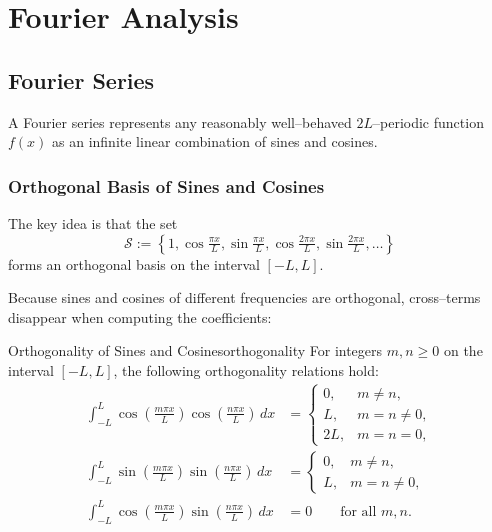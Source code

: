 \chapter{Fourier Analysis}
\label{ch:fourier}

\section{Fourier Series}
\label{sec:fourier-series}

A Fourier series represents any reasonably well--behaved \(2L\)--periodic function \(f(x)\) as an infinite linear combination of sines and cosines.

\subsection{Orthogonal Basis of Sines and Cosines}
The key idea is that the set
\begin{equation}
    \mathcal{S} := \left\{1,\cos\tfrac{\pi x}{L},\sin\tfrac{\pi x}{L},\cos\tfrac{2\pi x}{L},\sin\tfrac{2\pi x}{L},\dots \right\}
\end{equation}
forms an orthogonal basis on the interval \([-L,L]\).

Because sines and cosines of different frequencies are orthogonal, cross--terms disappear when computing the coefficients:

\begin{proposition}{Orthogonality of Sines and Cosines}{orthogonality}
    For integers \( m, n \geq 0 \) on the interval \([-L, L]\), the following orthogonality relations hold:
    \begin{align*}
        \int_{-L}^{L} \cos\left(\tfrac{m\pi x}{L}\right) \cos\left(\tfrac{n\pi x}{L}\right) \, dx
         & =
        \begin{cases}
            0,  & m \neq n,     \\
            L,  & m = n \neq 0, \\
            2L, & m = n = 0,
        \end{cases}                 \\
        \int_{-L}^{L} \sin\left(\tfrac{m\pi x}{L}\right) \sin\left(\tfrac{n\pi x}{L}\right) \, dx
         & =
        \begin{cases}
            0, & m \neq n,     \\
            L, & m = n \neq 0,
        \end{cases}                  \\
        \int_{-L}^{L} \cos\left(\tfrac{m\pi x}{L}\right) \sin\left(\tfrac{n\pi x}{L}\right) \, dx
         & = 0 \qquad \text{for all } m, n.
    \end{align*}
\end{proposition}

